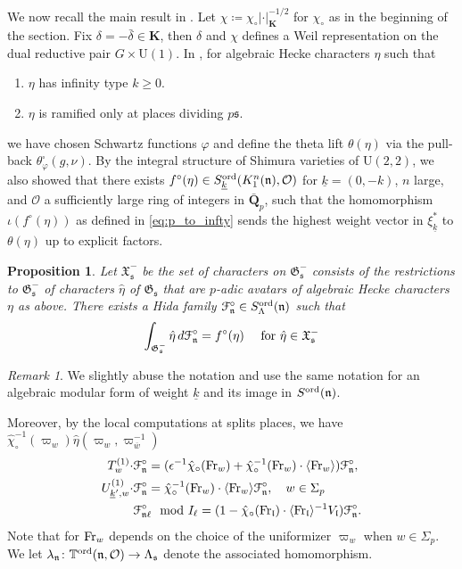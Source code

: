 \documentclass[leqno]{amsart}
\newcommand{\euF}{\EuScript{F}} %
\newcommand{\bnu}{\mathbb{\nu}}
\newcommand{\wt}[1]{\underline{ #1 }}
\newcommand{\TT}{\mathbb{T}} %
\newcommand{\fG}{\mathfrak{G}}
\newcommand{\fX}{\mathfrak{X}}
\newcommand{\bw}{\overline{w}}
\newcommand{\Fr}{\textnormal{Fr}} %
\newcommand{\ord}{\textnormal{ord}}
\newcommand{\Q}{{\mathbf{Q}}}
\newcommand{\K}{{\mathbf{K}}} %
\newcommand{\oo}{\mathcal{O}} %
\newcommand{\fs}{\mathfrak{s}}
\newcommand{\fn}{\mathfrak{n}}
\newcommand{\fl}{\mathfrak{l}}
\newtheorem{prop}[thm]{Proposition}
\theoremstyle{definition}
\theoremstyle{remark}
\newtheorem{rem}[thm]{Remark}
\begin{document}
We now recall the main result in \cite{lee}.
Let $\chi\coloneqq \chi_\circ|\cdot|_\K^{-1/2}$
for $\chi_\circ$ as in the beginning of the section.
Fix $\delta=-\bar{\delta}\in \K$,
then $\delta$ and $\chi$
defines a Weil representation
on the dual reductive pair $G\times \mathrm{U}(1)$.
In \cite[\S 4]{lee},
for algebraic Hecke characters $\eta$ such that 
\begin{enumerate}
    \item $\eta$ has infinity type $k\geq 0$.
    \item $\eta$ is ramified only at places dividing $p\fs$.
\end{enumerate}
we have chosen Schwartz functions $\varphi$ 
and define the theta lift 
$\theta(\eta)$ via the pull-back
$\theta^\square_\varphi(g,\bnu)$.
By the integral structure of Shimura varieties
of $\mathrm{U}(2,2)$,
we also showed that 
there exists  $f^\circ(\eta)\in 
S_{\wt{k}}^{\ord}(K^n_1(\fn),\oo)$
for $\wt{k}=(0,-k)$, $n$ large, and 
$\oo$ a sufficiently large ring of integers in $ \bar{\Q}_p$,
such that the homomorphism
$\iota(f^\circ(\eta))$ as defined in \eqref{eq:p_to_infty}
sends the highest weight vector in  $\xi_{\wt{k}}^*$
to $\theta(\eta)$ up to explicit factors.
\begin{prop}\cite[Thm 7.6]{lee}
	Let $\fX_{\fs}^-$ be the set of characters
	on $\fG_{\fs}^-$ consists of 
	the restrictions to $\fG_{\fs}^-$ of characters 
	$\hat{\eta}$ of $\fG_{\fs}$
	that are $p$-adic avatars of 
	algebraic  Hecke characters  $\eta$ as above.
	There exists a Hida family 
	$\euF^\circ_{\fn}\in S^{\ord}_\Lambda(\fn)$
	such that 
	\[
		\int_{\fG_{\fs}^-}\hat{\eta}\,d\euF^\circ_\fn
		=f^\circ(\eta)\quad
		\text{ for } \hat{\eta}\in \fX_{\fs}^-
	\]
\end{prop}
\begin{rem}
	We slightly abuse the notation
	and use the same notation 
	for an algebraic modular form of weight $\wt{k}$
	 and its image in $S^{\ord}(\fn)$.
\end{rem}

Moreover, by the local computations at splits
places, we have $\hat{\chi}^{-1}_\circ(\varpi_w)\hat{\eta}(\varpi_w,\varpi_{\bw}^{-1})$
\begin{align*}
	T_w^{(1)}\cdot &\euF^\circ_{\fn}=
	(\epsilon^{-1}\hat{\chi}_\circ(\Fr_w)
	+\hat{\chi}^{-1}_\circ(\Fr_w)\cdot 
	\langle \Fr_w\rangle )
	\euF^\circ_{\fn},\\
	U_{\wt{k}',w}^{(1)}\cdot &\euF^{\circ}_{\fn}=
	\hat{\chi}_\circ^{-1}(\Fr_w)\cdot 
	\langle \Fr_w\rangle
	\euF^{\circ}_{\fn},\quad w\in \Sigma_p\\
	 &\euF^\circ_{\fn\ell} \mod I_{\ell}=
	(1-\hat{\chi}_\circ(\Fr_\fl)\cdot 
	\langle \Fr_\fl\rangle^{-1} V_\fl)
	\euF^\circ_{\fn}.
\end{align*}
Note that for $\Fr_w$ depends on the 
choice of the uniformizer  $\varpi_w$ when  $w\in \Sigma_p$.
We let 
$\lambda_{\fn}\colon\TT^{\ord}(\fn,\oo)\to\Lambda_{\fs}$
denote the associated homomorphism.
\end{document}
